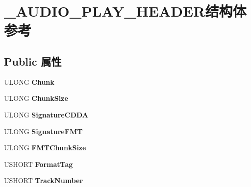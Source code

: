 \hypertarget{struct___a_u_d_i_o___p_l_a_y___h_e_a_d_e_r}{}\section{\+\_\+\+A\+U\+D\+I\+O\+\_\+\+P\+L\+A\+Y\+\_\+\+H\+E\+A\+D\+E\+R结构体 参考}
\label{struct___a_u_d_i_o___p_l_a_y___h_e_a_d_e_r}
\subsection*{Public 属性}
\begin{DoxyCompactItemize}
\item 
\mbox{\label{struct___a_u_d_i_o___p_l_a_y___h_e_a_d_e_r_a9a3fdfaaba2afddc1c58b082c47d356d}} 
U\+L\+O\+NG {\bfseries Chunk}
\item 
\mbox{\label{struct___a_u_d_i_o___p_l_a_y___h_e_a_d_e_r_a5285302ef8c553f6519414ae4ef2453e}} 
U\+L\+O\+NG {\bfseries Chunk\+Size}
\item 
\mbox{\label{struct___a_u_d_i_o___p_l_a_y___h_e_a_d_e_r_ab5bb2e5a8ae4dfdfe961a8e64c954c22}} 
U\+L\+O\+NG {\bfseries Signature\+C\+D\+DA}
\item 
\mbox{\label{struct___a_u_d_i_o___p_l_a_y___h_e_a_d_e_r_a6ea7cc6d8bd3253c5496ed47d41a0e46}} 
U\+L\+O\+NG {\bfseries Signature\+F\+MT}
\item 
\mbox{\label{struct___a_u_d_i_o___p_l_a_y___h_e_a_d_e_r_ab6f4cc23bffbe345ed2c121cc4cbeb77}} 
U\+L\+O\+NG {\bfseries F\+M\+T\+Chunk\+Size}
\item 
\mbox{\label{struct___a_u_d_i_o___p_l_a_y___h_e_a_d_e_r_a1533fa4dbb718d977c815381fbec9460}} 
U\+S\+H\+O\+RT {\bfseries Format\+Tag}
\item 
\mbox{\label{struct___a_u_d_i_o___p_l_a_y___h_e_a_d_e_r_ad7cc98a13303749c43b70d961e8b5db0}} 
U\+S\+H\+O\+RT {\bfseries Track\+Number}

\end{DoxyCompactItemize}
